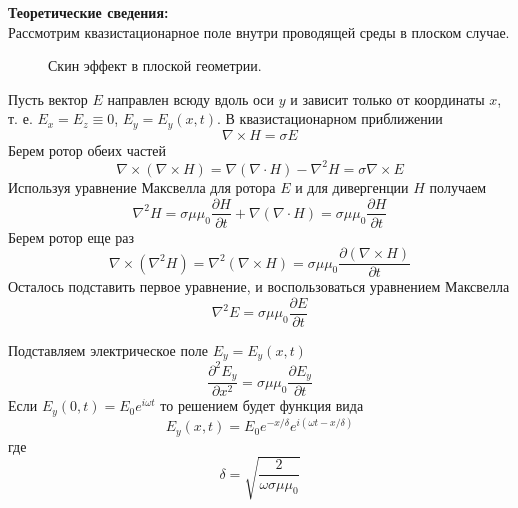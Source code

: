 \documentclass[a4paper, 12pt]{article}%
\begin{document}
	\textbf{Теоретические сведения: } \\
	Рассмотрим квазистационарное поле внутри проводящей среды в плоском случае.
	\begin{figure}[H]
		\caption{Скин эффект в плоской геометрии.}
	\end{figure}
	Пусть вектор ${E}$ направлен всюду вдоль оси $y$  
	и зависит только от координаты $x$, т. е. ${E_x} = {E_z} \equiv 0$, $E_y=E_y(x,t)$.
	В квазистационарном приближении 
	\begin{equation}
		\nabla \times {H} = \sigma {E}
	\end{equation}
	Берем ротор обеих частей
	\begin{equation}
		\nabla \times (\nabla \times {H}) = \nabla(\nabla \cdot {H}) - \nabla^2{H} = \sigma \nabla \times {E}
	\end{equation}
	Используя уравнение Максвелла для ротора ${E}$ и для дивергенции ${H}$ получаем
	\begin{equation}
		\nabla^2 {H} = \sigma\mu\mu_0\frac{\partial{H}}{\partial t} 
		+ \nabla(\nabla \cdot {H}) = \sigma\mu\mu_0\frac{\partial{H}}{\partial t} 
		\label{eq:laplacian_H}
	\end{equation}
	Берем ротор еще раз
	\begin{equation}
		\nabla \times (\nabla^2{H}) = \nabla^2 (\nabla \times {H}) =
		\sigma\mu\mu_0 \frac{\partial (\nabla \times {H})}{\partial t}
	\end{equation}
	Осталось подставить первое уравнение, и воспользоваться уравнением Максвелла
	\begin{equation}
		\nabla^2{E}=\sigma\mu\mu_0 \frac{\partial {E}}{\partial t}\label{eq:diffusion}
	\end{equation}
	
	Подставляем электрическое поле $E_y=E_y(x,t)$
	\begin{equation}
		\frac{\partial^2 E_y}{\partial x^2} = \sigma\mu\mu_0\frac{\partial E_y}{\partial t}
		\label{eq:diffusion_chastni}
	\end{equation}
	Если $E_y(0,t)=E_0 e^{i\omega t}$ то решением будет функция вида
	\begin{equation}
		E_y(x,t)=E_0 e^{-x/\delta} e^{i(\omega t - x/\delta)}
		\label{eq:skin_effect_poluprostranstvo}
	\end{equation}
	где
	\begin{equation}
		\delta = \sqrt{\frac{2}{\omega\sigma\mu\mu_0}}
		\label{eq:delta}
	\end{equation}
	
\end{document}
